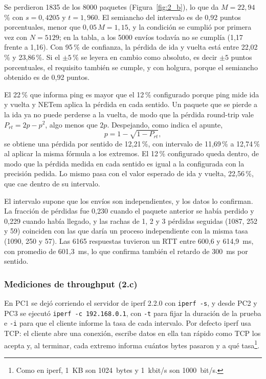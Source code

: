 \documentclass[11pt]{article}
\begin{document}
Se perdieron 1835 de los 8000 paquetes (Figura~\ref{fig:2_b}), lo que da $M = 22{,}94$\,\% con $s = 0{,}4205$ y $t = 1{,}960$. El semiancho del intervalo es de 0,92 puntos porcentuales, menor que $0{,}05\,M = 1{,}15$, y la condición se cumplió por primera vez con $N = 5129$; en la tabla, a los 5000 envíos todavía no se cumplía (1,17 frente a 1,16). Con 95\,\% de confianza, la pérdida de ida y vuelta está entre 22,02\,\% y 23,86\,\%. Si el $\pm 5$\,\% se leyera en cambio como absoluto, es decir $\pm 5$ puntos porcentuales, el requisito también se cumple, y con holgura, porque el semiancho obtenido es de 0,92 puntos.

El 22\,\% que informa ping es mayor que el 12\,\% configurado porque ping mide ida y vuelta y NETem aplica la pérdida en cada sentido. Un paquete que se pierde a la ida ya no puede perderse a la vuelta, de modo que la pérdida round-trip vale $P_{rt} = 2p - p^2$, algo menos que $2p$. Despejando, como indica el apunte,
\begin{equation}
p = 1 - \sqrt{1 - P_{rt}} ,
\end{equation}
se obtiene una pérdida por sentido de 12,21\,\%, con intervalo de 11,69\,\% a 12,74\,\% al aplicar la misma fórmula a los extremos. El 12\,\% configurado queda dentro, de modo que la pérdida medida en cada sentido es igual a la configurada con la precisión pedida. Lo mismo pasa con el valor esperado de ida y vuelta, 22,56\,\%, que cae dentro de su intervalo.

El intervalo supone que los envíos son independientes, y los datos lo confirman. La fracción de pérdidas fue 0,230 cuando el paquete anterior se había perdido y 0,229 cuando había llegado, y las rachas de 1, 2 y 3 pérdidas seguidas (1087, 252 y 59) coinciden con las que daría un proceso independiente con la misma tasa (1090, 250 y 57). Las 6165 respuestas tuvieron un RTT entre 600,6 y 614,9~ms, con promedio de 601,3~ms, lo que confirma también el retardo de 300~ms por sentido.

\subsubsection{Mediciones de throughput (2.c)}

En PC1 se dejó corriendo el servidor de iperf 2.2.0 con \texttt{iperf -s}, y desde PC2 y PC3 se ejecutó \texttt{iperf -c 192.168.0.1}, con \texttt{-t} para fijar la duración de la prueba e \texttt{-i} para que el cliente informe la tasa de cada intervalo. Por defecto iperf usa TCP: el cliente abre una conexión, escribe datos en ella tan rápido como TCP los acepta y, al terminar, cada extremo informa cuántos bytes pasaron y a qué tasa\footnote{Como en iperf, 1~KB son 1024~bytes y 1~kbit/s son 1000~bit/s.}.
\end{document}
